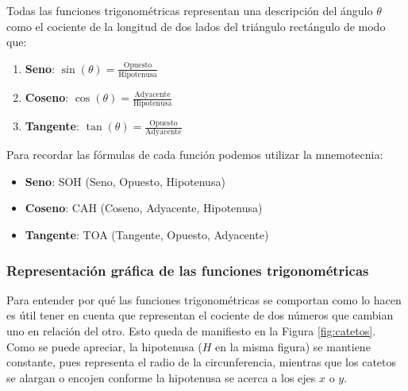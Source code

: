 \documentclass[
]{book}
\providecommand{\tightlist}{%
  \setlength{\itemsep}{0pt}\setlength{\parskip}{0pt}}
\begin{document}
Todas las funciones trigonométricas representan una descripción del ángulo \(\theta\) como el cociente de la longitud de dos lados del triángulo rectángulo de modo que:

\begin{enumerate}
\def\labelenumi{\arabic{enumi}.}
\tightlist
\item
  \textbf{Seno}: \(\sin(\theta) = \frac{\mathrm{Opuesto}}{\mathrm{Hipotenusa}}\)
\item
  \textbf{Coseno}: \(\cos(\theta) = \frac{\mathrm{Adyacente}}{\mathrm{Hipotenusa}}\)
\item
  \textbf{Tangente}: \(\tan(\theta) = \frac{\mathrm{Opuesto}}{\mathrm{Adyacente}}\)
\end{enumerate}

Para recordar las fórmulas de cada función podemos utilizar la mnemotecnia:

\begin{itemize}
\tightlist
\item
  \textbf{Seno}: SOH (Seno, Opuesto, Hipotenusa)
\item
  \textbf{Coseno}: CAH (Coseno, Adyacente, Hipotenusa)
\item
  \textbf{Tangente}: TOA (Tangente, Opuesto, Adyacente)
\end{itemize}

\hypertarget{representaciuxf3n-gruxe1fica-de-las-funciones-trigonomuxe9tricas}{%
\subsubsection{Representación gráfica de las funciones trigonométricas}\label{representaciuxf3n-gruxe1fica-de-las-funciones-trigonomuxe9tricas}}

Para entender por qué las funciones trigonométricas se comportan como lo hacen es útil tener en cuenta que representan el cociente de dos números que cambian uno en relación del otro. Esto queda de manifiesto en la Figura \ref{fig:catetos}. Como se puede apreciar, la hipotenusa (\(H\) en la misma figura) se mantiene constante, pues representa el radio de la circunferencia, mientras que los catetos se alargan o encojen conforme la hipotenusa se acerca a los ejes \(x\) o \(y\).
\end{document}
